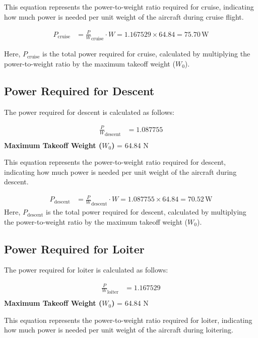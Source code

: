 \documentclass[12 pt]{article}
\begin{document}
This equation represents the power-to-weight ratio required for cruise, indicating how much power is needed per unit weight of the aircraft during cruise flight.

\begin{align*}
P_{\text{cruise}} &= \frac{P}{W}_{\text{cruise}} \cdot W = 1.167529 \times 64.84 = 75.70 \, \text{W} \tag{3.27}
\end{align*}

Here, $P_{\text{cruise}}$ is the total power required for cruise, calculated by multiplying the power-to-weight ratio by the maximum takeoff weight ($W_0$).

\subsection{{Power Required for Descent}}

The power required for descent is calculated as follows:

\begin{align*}
\frac{P}{W}_{\text{descent}} &= 1.087755 \tag{3.28} \\
\end{align*}
\textbf{Maximum Takeoff Weight ($W_0$)} = 64.84 N

This equation represents the power-to-weight ratio required for descent, indicating how much power is needed per unit weight of the aircraft during descent.

\begin{align*}
P_{\text{descent}} &= \frac{P}{W}_{\text{descent}} \cdot W = 1.087755 \times 64.84 = 70.52 \, \text{W} \tag{3.29}
\end{align*}
Here, $P_{\text{descent}}$ is the total power required for descent, calculated by multiplying the power-to-weight ratio by the maximum takeoff weight ($W_0$).

\subsection{{Power Required for Loiter}}

The power required for loiter is calculated as follows:

\begin{align*}
\frac{P}{W}_{\text{loiter}} &= 1.167529 \tag{3.30} \\
\end{align*}
\textbf{Maximum Takeoff Weight ($W_0$)} = 64.84 N

This equation represents the power-to-weight ratio required for loiter, indicating how much power is needed per unit weight of the aircraft during loitering.
\end{document}
